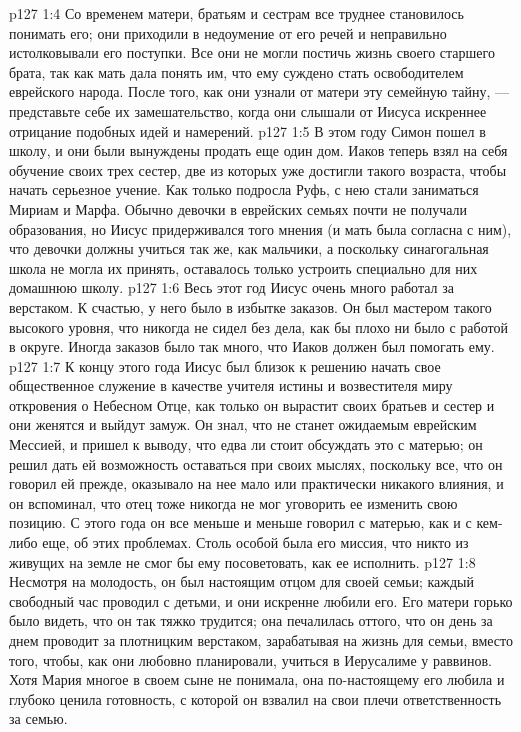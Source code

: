 \vs p127 1:4 \pc Со временем матери, братьям и сестрам все труднее становилось понимать его; они приходили в недоумение от его речей и неправильно истолковывали его поступки. Все они не могли постичь жизнь своего старшего брата, так как мать дала понять им, что ему суждено стать освободителем еврейского народа. После того, как они узнали от матери эту семейную тайну, --- представьте себе их замешательство, когда они слышали от Иисуса искреннее отрицание подобных идей и намерений.
\vs p127 1:5 \pc В этом году Симон пошел в школу, и они были вынуждены продать еще один дом. Иаков теперь взял на себя обучение своих трех сестер, две из которых уже достигли такого возраста, чтобы начать серьезное учение. Как только подросла Руфь, с нею стали заниматься Мириам и Марфа. Обычно девочки в еврейских семьях почти не получали образования, но Иисус придерживался того мнения (и мать была согласна с ним), что девочки должны учиться так же, как мальчики, а поскольку синагогальная школа не могла их принять, оставалось только устроить специально для них домашнюю школу.
\vs p127 1:6 Весь этот год Иисус очень много работал за верстаком. К счастью, у него было в избытке заказов. Он был мастером такого высокого уровня, что никогда не сидел без дела, как бы плохо ни было с работой в округе. Иногда заказов было так много, что Иаков должен был помогать ему.
\vs p127 1:7 К концу этого года Иисус был близок к решению начать свое общественное служение в качестве учителя истины и возвестителя миру откровения о Небесном Отце, как только он вырастит своих братьев и сестер и они женятся и выйдут замуж. Он знал, что не станет ожидаемым еврейским Мессией, и пришел к выводу, что едва ли стоит обсуждать это с матерью; он решил дать ей возможность оставаться при своих мыслях, поскольку все, что он говорил ей прежде, оказывало на нее мало или практически никакого влияния, и он вспоминал, что отец тоже никогда не мог уговорить ее изменить свою позицию. С этого года он все меньше и меньше говорил с матерью, как и с кем\hyp{}либо еще, об этих проблемах. Столь особой была его миссия, что никто из живущих на земле не смог бы ему посоветовать, как ее исполнить.
\vs p127 1:8 Несмотря на молодость, он был настоящим отцом для своей семьи; каждый свободный час проводил с детьми, и они искренне любили его. Его матери горько было видеть, что он так тяжко трудится; она печалилась оттого, что он день за днем проводит за плотницким верстаком, зарабатывая на жизнь для семьи, вместо того, чтобы, как они любовно планировали, учиться в Иерусалиме у раввинов. Хотя Мария многое в своем сыне не понимала, она по\hyp{}настоящему его любила и глубоко ценила готовность, с которой он взвалил на свои плечи ответственность за семью.
